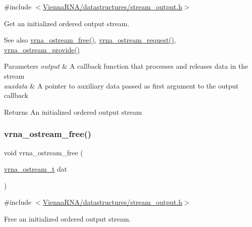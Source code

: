 {\ttfamily \#include $<$\mbox{\hyperlink{datastructures_2stream__output_8h}{Vienna\+R\+N\+A/datastructures/stream\+\_\+output.\+h}}$>$}



Get an initialized ordered output stream. 

\begin{DoxySeeAlso}{See also}
\mbox{\hyperlink{group__buffer__utils_gaf813ec90e1446ba82c89f9a39688a3b3}{vrna\+\_\+ostream\+\_\+free()}}, \mbox{\hyperlink{group__buffer__utils_gaebca91932705d71bcbf00bd8d82bd7c8}{vrna\+\_\+ostream\+\_\+request()}}, \mbox{\hyperlink{group__buffer__utils_ga6253c42abdeaf3b41a38204865e1f0f7}{vrna\+\_\+ostream\+\_\+provide()}}
\end{DoxySeeAlso}

\begin{DoxyParams}{Parameters}
{\em output} & A callback function that processes and releases data in the stream \\
\hline
{\em auxdata} & A pointer to auxiliary data passed as first argument to the {\ttfamily output} callback \\
\hline
\end{DoxyParams}
\begin{DoxyReturn}{Returns}
An initialized ordered output stream 
\end{DoxyReturn}
\mbox{\label{group__buffer__utils_gaf813ec90e1446ba82c89f9a39688a3b3}} 
\subsubsection{\texorpdfstring{vrna\_ostream\_free()}{vrna\_ostream\_free()}}
{\footnotesize\ttfamily void vrna\+\_\+ostream\+\_\+free (\begin{DoxyParamCaption}\item[{\mbox{\hyperlink{group__buffer__utils_ga8da189552af21ab6e4e88bdcc240870c}{vrna\+\_\+ostream\+\_\+t}}}]{dat }\end{DoxyParamCaption})}



{\ttfamily \#include $<$\mbox{\hyperlink{datastructures_2stream__output_8h}{Vienna\+R\+N\+A/datastructures/stream\+\_\+output.\+h}}$>$}



Free an initialized ordered output stream. 

